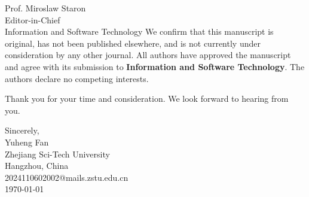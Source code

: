 \documentclass[11pt]{letter}
\makeatletter
\newcommand{\AuthorName}{Yuheng Fan}
\newcommand{\AuthorAffiliation}{Zhejiang Sci-Tech University}
\newcommand{\AuthorAddress}{Hangzhou, China}
\newcommand{\AuthorEmail}{2024110602002@mails.zstu.edu.cn}
\newcommand{\SubmissionDate}{\today}
\newcommand{\EditorName}{Prof. Miroslaw Staron}
\newcommand{\EditorTitle}{Editor-in-Chief}
\newcommand{\JournalName}{Information and Software Technology}
\makeatother
\begin{document}
\begin{letter}{\EditorName \\ \EditorTitle \\ \JournalName}
We confirm that this manuscript is original, has not been published elsewhere, and is not currently under consideration by any other journal. All authors have approved the manuscript and agree with its submission to \textbf{\JournalName}. The authors declare no competing interests.

Thank you for your time and consideration. We look forward to hearing from you.

\closing{Sincerely,\\
\vspace{1cm}
\AuthorName \\
\AuthorAffiliation \\
\AuthorAddress \\
\AuthorEmail \\
\SubmissionDate}

\end{letter}
\end{document}
